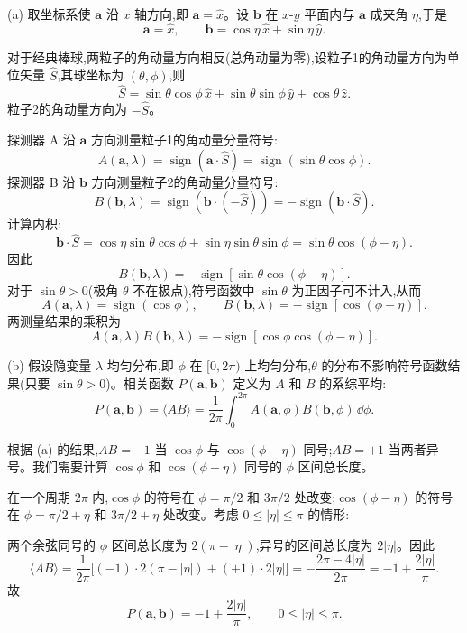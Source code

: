 \begin{solution}
(a) 取坐标系使 $\mathbf a$ 沿 $x$ 轴方向,即 $\mathbf a = \hat x$。设 $\mathbf b$ 在 $x$-$y$ 平面内与 $\mathbf a$ 成夹角 $\eta$,于是
\[
\mathbf a = \hat x,\qquad \mathbf b = \cos\eta\,\hat x + \sin\eta\,\hat y.
\]

对于经典棒球,两粒子的角动量方向相反(总角动量为零),设粒子1的角动量方向为单位矢量 $\hat S$,其球坐标为 $(\theta,\phi)$,则
\[
\hat S = \sin\theta\cos\phi\,\hat x + \sin\theta\sin\phi\,\hat y + \cos\theta\,\hat z.
\]
粒子2的角动量方向为 $-\hat S$。

探测器 A 沿 $\mathbf a$ 方向测量粒子1的角动量分量符号:
\[
A(\mathbf a,\lambda) = \operatorname{sign}(\mathbf a\cdot\hat S) = \operatorname{sign}(\sin\theta\cos\phi).
\]
探测器 B 沿 $\mathbf b$ 方向测量粒子2的角动量分量符号:
\[
B(\mathbf b,\lambda) = \operatorname{sign}(\mathbf b\cdot(-\hat S)) = -\operatorname{sign}(\mathbf b\cdot\hat S).
\]
计算内积:
\[
\mathbf b\cdot\hat S = \cos\eta\sin\theta\cos\phi + \sin\eta\sin\theta\sin\phi = \sin\theta\cos(\phi-\eta).
\]
因此
\[
B(\mathbf b,\lambda) = -\operatorname{sign}[\sin\theta\cos(\phi-\eta)].
\]
对于 $\sin\theta > 0$(极角 $\theta$ 不在极点),符号函数中 $\sin\theta$ 为正因子可不计入,从而
\[
A(\mathbf a,\lambda) = \operatorname{sign}(\cos\phi),\qquad
B(\mathbf b,\lambda) = -\operatorname{sign}[\cos(\phi-\eta)].
\]
两测量结果的乘积为
\[
\boxed{A(\mathbf a,\lambda)B(\mathbf b,\lambda) = -\operatorname{sign}[\cos\phi\cos(\phi-\eta)].}
\]

(b) 假设隐变量 $\lambda$ 均匀分布,即 $\phi$ 在 $[0,2\pi)$ 上均匀分布,$\theta$ 的分布不影响符号函数结果(只要 $\sin\theta>0$)。相关函数 $P(\mathbf a,\mathbf b)$ 定义为 $A$ 和 $B$ 的系综平均:
\[
P(\mathbf a,\mathbf b) = \langle AB\rangle = \frac{1}{2\pi}\int_0^{2\pi} A(\mathbf a,\phi)B(\mathbf b,\phi)\,\dd\phi.
\]

根据 (a) 的结果,$AB = -1$ 当 $\cos\phi$ 与 $\cos(\phi-\eta)$ 同号;$AB = +1$ 当两者异号。我们需要计算 $\cos\phi$ 和 $\cos(\phi-\eta)$ 同号的 $\phi$ 区间总长度。

在一个周期 $2\pi$ 内,$\cos\phi$ 的符号在 $\phi = \pi/2$ 和 $3\pi/2$ 处改变;$\cos(\phi-\eta)$ 的符号在 $\phi = \pi/2+\eta$ 和 $3\pi/2+\eta$ 处改变。考虑 $0\le |\eta|\le\pi$ 的情形:

两个余弦同号的 $\phi$ 区间总长度为 $2(\pi-|\eta|)$,异号的区间总长度为 $2|\eta|$。因此
\[
\langle AB\rangle = \frac{1}{2\pi}\bigl[(-1)\cdot 2(\pi-|\eta|) + (+1)\cdot 2|\eta|\bigr]
= -\frac{2\pi-4|\eta|}{2\pi} = -1 + \frac{2|\eta|}{\pi}.
\]
故
\[
\boxed{P(\mathbf a,\mathbf b) = -1 + \frac{2|\eta|}{\pi},\qquad 0\le|\eta|\le\pi.}
\]


\end{solution}
